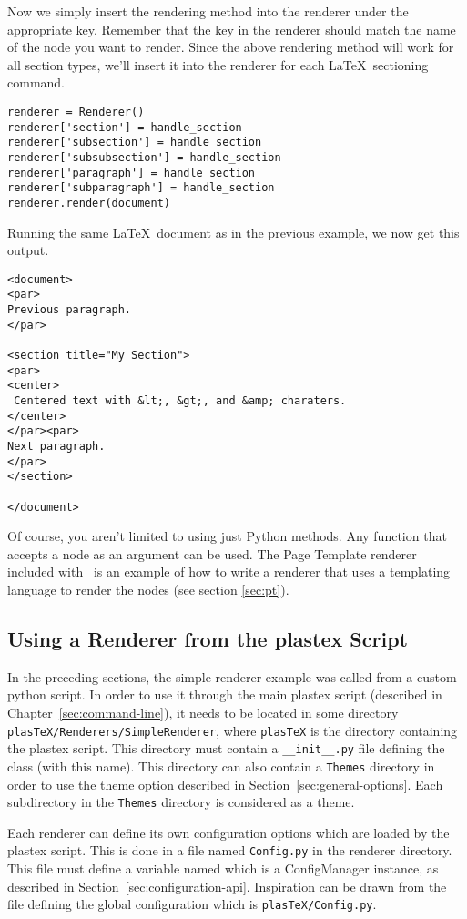 Now we simply insert the rendering method into the renderer under the
appropriate key.  Remember that the key in the renderer should match
the name of the node you want to render.  Since the above rendering
method will work for all section types, we'll insert it into the
renderer for each \LaTeX\ sectioning command.
\begin{verbatim}
renderer = Renderer()
renderer['section'] = handle_section
renderer['subsection'] = handle_section
renderer['subsubsection'] = handle_section
renderer['paragraph'] = handle_section
renderer['subparagraph'] = handle_section
renderer.render(document)
\end{verbatim}

Running the same \LaTeX\ document as in the previous example, we now get
this output.
\begin{verbatim}
<document>
<par>
Previous paragraph.
</par>

<section title="My Section">
<par>
<center>
 Centered text with &lt;, &gt;, and &amp; charaters.
</center>
</par><par>
Next paragraph.
</par>
</section>

</document>
\end{verbatim}

Of course, you aren't limited to using just Python methods.  Any function
that accepts a node as an argument can be used.  The
Page Template renderer included with \plasTeX\ is an example
of how to write a renderer that uses a templating language to render
the nodes (see section \ref{sec:pt}).

\subsection{Using a Renderer from the plastex Script}
\label{subsec:renderer-from-script}

In the preceding sections, the simple renderer example was called from
a custom python script. In order to use it through the
main plastex script (described in Chapter~\ref{sec:command-line}), it
needs to be located in some directory
\verb+plasTeX/Renderers/SimpleRenderer+, where \verb+plasTeX+ is the
directory containing the plastex script. This directory must contain a
\verb+__init__.py+ file defining the  class (with this
name). This directory can also contain a \verb+Themes+ directory in
order to use the theme option described in
Section~\ref{sec:general-options}. Each subdirectory in the
\verb+Themes+ directory is considered as a theme.

Each renderer can define its own configuration options which are loaded
by the plastex script. This is done in a file named \verb+Config.py+
in the renderer directory. This file must define a variable named
 which is a ConfigManager instance, as described in
Section~\ref{sec:configuration-api}. Inspiration can be drawn from the
file defining the global configuration which is
\verb+plasTeX/Config.py+.


